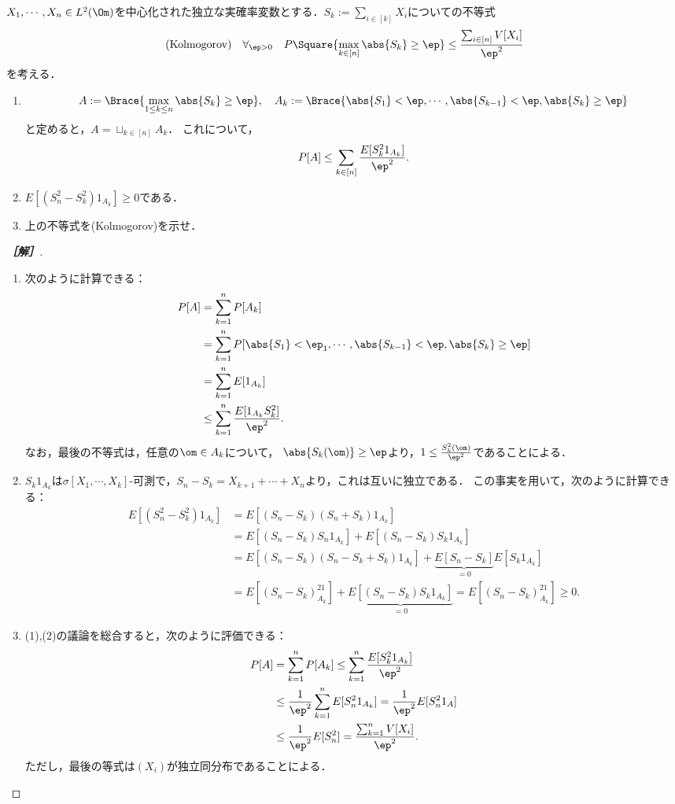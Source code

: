 \documentclass[uplatex,dvipdfmx]{jsarticle}
\begin{document}
\begin{problem*}[15]
    $X_1,\cdots,X_n\in L^2(\Om)$を中心化された独立な実確率変数とする．$S_k:=\sum_{i\in[k]}X_i$についての不等式
    \[\text{(Kolmogorov)}\quad \forall_{\ep>0}\quad P\Square{\max_{k\in[n]}\abs{S_k}\ge\ep}\le\frac{\sum_{i\in[n]}V[X_i]}{\ep^2}\]
    を考える．
    \begin{enumerate}
        \item \[A:=\Brace{\max_{1\le k\le n}\abs{S_k}\ge\ep},\quad A_k:=\Brace{\abs{S_1}<\ep,\cdots,\abs{S_{k-1}}<\ep,\abs{S_k}\ge\ep}\]
        と定めると，$A=\sqcup_{k\in[n]}A_k$．
        これについて，
        \[P[A]\le\sum_{k\in[n]}\frac{E[S_k^21_{A_k}]}{\ep^2}.\]
        \item $E[(S^2_n-S^2_k)1_{A_k}]\ge0$である．
        \item 上の不等式を(Kolmogorov)を示せ．
    \end{enumerate}
\end{problem*}
\begin{proof}[\bf［解］]\mbox{}
    \begin{enumerate}
        \item 次のように計算できる：
        \begin{align*}
            P[A]&=\sum_{k=1}^nP[A_k]\\
            &=\sum_{k=1}^nP[\abs{S_1}<\ep_1,\cdots,\abs{S_{k-1}}<\ep,\abs{S_k}\ge\ep]\\
            &=\sum_{k=1}^nE[1_{A_k}]\\
            &\le\sum_{k=1}^n\frac{E[1_{A_k}S^2_k]}{\ep^2}.
        \end{align*}
        なお，最後の不等式は，任意の$\om\in A_k$について，
        $\abs{S_k(\om)}\ge\ep$より，$1\le\frac{S_k^2(\om)}{\ep^2}$であることによる．
        \item $S_k1_{A_k}$は$\sigma[X_1,\cdots,X_k]$-可測で，$S_n-S_k=X_{k+1}+\cdots+X_n$より，これは互いに独立である．
        この事実を用いて，次のように計算できる：
        \begin{align*}
            E[(S_n^2-S_k^2)1_{A_k}]&=E[(S_n-S_k)(S_n+S_k)1_{A_k}]\\
            &=E[(S_n-S_k)S_n1_{A_k}]+E[(S_n-S_k)S_k1_{A_k}]\\
            &=E[(S_n-S_k)(S_n-S_k+S_k)1_{A_k}]+\underbrace{E[S_n-S_k]}_{=0}E[S_k1_{A_k}]\\
            &=E[(S_n-S_k)^21_{A_k}]+\underbrace{E[(S_n-S_k)S_k1_{A_k}]}_{=0}=E[(S_n-S_k)^21_{A_k}]\ge0.
        \end{align*}
        \item (1),(2)の議論を総合すると，次のように評価できる：
        \begin{align*}
            P[A]&=\sum_{k=1}^nP[A_k]\le\sum_{k=1}^n\frac{E[S_k^21_{A_k}]}{\ep^2}\\
            &\le\frac{1}{\ep^2}\sum_{k=1}^nE[S_n^21_{A_k}]=\frac{1}{\ep^2}E[S_n^21_A]\\
            &\le\frac{1}{\ep^2}E[S_n^2]=\frac{\sum_{k=1}^nV[X_i]}{\ep^2}.
        \end{align*}
        ただし，最後の等式は$(X_i)$が独立同分布であることによる．
    \end{enumerate}
\end{proof}
\end{document}
